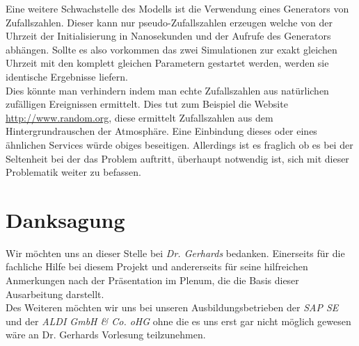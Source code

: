 \documentclass[10pt,twocolumn]{scrartcl}
\begin{document}
Eine weitere Schwachstelle des Modells ist die Verwendung eines Generators von Zufallszahlen. Dieser kann nur pseudo-Zufallszahlen erzeugen welche von der Uhrzeit der Initialisierung in Nanosekunden und der Aufrufe des Generators abhängen\cite{Oracle:2014}. Sollte es also vorkommen das zwei Simulationen zur exakt gleichen Uhrzeit mit den komplett gleichen Parametern gestartet werden, werden sie identische Ergebnisse liefern.\\
Dies könnte man verhindern indem man echte Zufallszahlen aus natürlichen zufälligen Ereignissen ermittelt. Dies tut zum Beispiel die Website \url{http://www.random.org}, diese ermittelt Zufallszahlen aus dem Hintergrundrauschen der Atmosphäre. Eine Einbindung dieses oder eines ähnlichen Services würde obiges beseitigen. Allerdings ist es fraglich ob es bei der Seltenheit bei der das Problem auftritt, überhaupt notwendig ist, sich mit dieser Problematik weiter zu befassen.



\section*{Danksagung}
Wir möchten uns an dieser Stelle bei \emph{Dr. Gerhards} bedanken. Einerseits für die fachliche Hilfe bei diesem Projekt und andererseits für seine hilfreichen Anmerkungen nach der Präsentation im Plenum, die die Basis dieser Ausarbeitung darstellt.\\
Des Weiteren möchten wir uns bei unseren Ausbildungsbetrieben der \emph{SAP SE} und der \emph{ALDI GmbH \& Co. oHG} ohne die es uns erst gar nicht möglich gewesen wäre an Dr. Gerhards Vorlesung teilzunehmen.
\end{document}
